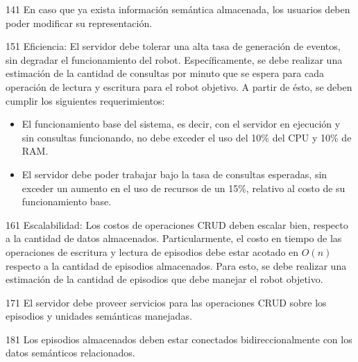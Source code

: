 \begin{requisito-sistema}{14}{1}
	En caso que ya exista información semántica almacenada, los usuarios deben poder modificar su representación.	
\end{requisito-sistema}

\begin{requisito-sistema}{15}{1}
	Eficiencia: El servidor debe tolerar una alta tasa de generación de eventos, sin degradar el funcionamiento del robot. Específicamente, se debe realizar una estimación de la cantidad de consultas por minuto que se espera para cada operación de lectura y escritura para el robot objetivo. A partir de ésto, se deben cumplir los siguientes requerimientos:
	\begin{itemize}
		\item El funcionamiento base del sistema, es decir, con el servidor en ejecución y sin consultas funcionando, no debe exceder el uso del 10\% del CPU y 10\% de RAM.
		\item El servidor debe poder trabajar bajo la tasa de consultas esperadas, sin exceder un aumento en el uso de recursos de un 15\%, relativo al costo de su funcionamiento base.
	\end{itemize}
\end{requisito-sistema}

\begin{requisito-sistema}{16}{1}
	Escalabilidad: Los costos de operaciones CRUD deben escalar bien, respecto a la cantidad de datos almacenados. Particularmente, el costo en tiempo de las operaciones de escritura y lectura de episodios debe estar acotado en $O(n)$ respecto a la cantidad de episodios almacenados. Para esto, se debe realizar una estimación de la cantidad de episodios que debe manejar el robot objetivo.
\end{requisito-sistema}

\begin{requisito-sistema}{17}{1}
	El servidor debe proveer servicios para las operaciones CRUD sobre los episodios y unidades semánticas manejadas.	
\end{requisito-sistema}

\begin{requisito-sistema}{18}{1}
	Los episodios almacenados deben estar conectados bidireccionalmente con los datos semánticos relacionados.	
\end{requisito-sistema}

